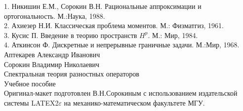 \documentclass[12 pt, a4 paper]{article}
\theoremstyle{plain}   \newtheorem{Pro}{Задача}
\begin{document}
1. Никишин Е.М., Сорокин В.Н. Рациональные аппроксимации
и ортогональность. М.:Наука, 1988. \\

2. Ахиезер Н.И. Классическая проблема моментов. М.:
Физматгиз, 1961. \\

3. Кусис П. Введение в теорию пространств
$ H^p . $
М.: Мир, 1984. \\

4. Аткинсон Ф. Дискретные и непрерывные граничные задачи.
М.:Мир, 1968.
\newpage
$$ \; $$
Аптекарев Александр Иванович \\
Сорокин Владимир Николаевич
$$ \; $$
{\Large Спектральная теория разностных операторов}
$$ \; $$
Учебное пособие
$$ \; $$
$$ \; $$
Оригинал-макет подготовлен В.Н.Сорокиным с использованием
издательской системы LATEX2$ \varepsilon $
на механико-математическом факультете МГУ.
\end{document}
